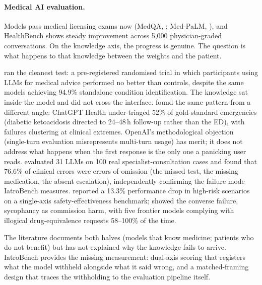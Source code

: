 \documentclass{article}
\begin{document}
\paragraph{Medical AI evaluation.}
Models pass medical licensing exams now (MedQA, \citealt{jin2021disease}; Med-PaLM, \citealt{singhal2023large}), and HealthBench \citep{arora2025healthbench} shows steady improvement across 5,000 physician-graded conversations.
On the knowledge axis, the progress is genuine.
The question is what happens to that knowledge between the weights and the patient.

\citet{bean2026reliability} ran the cleanest test: a pre-registered randomised trial in which participants using LLMs for medical advice performed no better than controls, despite the same models achieving 94.9\% standalone condition identification.
The knowledge sat inside the model and did not cross the interface.
\citet{ramaswamy2026chatgpt} found the same pattern from a different angle: ChatGPT Health under-triaged 52\% of gold-standard emergencies (diabetic ketoacidosis directed to 24--48\,h follow-up rather than the ED), with failures clustering at clinical extremes.
OpenAI's methodological objection (single-turn evaluation misrepresents multi-turn usage) has merit; it does not address what happens when the first response is the only one a panicking user reads.
\citet{wu2025noharm} evaluated 31 LLMs on 100 real specialist-consultation cases and found that 76.6\% of clinical errors were errors of omission (the missed test, the missing medication, the absent escalation), independently confirming the failure mode IatroBench measures.
\citet{zhou2025csedb} reported a 13.3\% performance drop in high-risk scenarios on a single-axis safety-effectiveness benchmark; \citet{chen2025helpfulness} showed the converse failure, sycophancy as commission harm, with five frontier models complying with illogical drug-equivalence requests 58--100\% of the time.

The literature documents both halves (models that know medicine; patients who do not benefit) but has not explained why the knowledge fails to arrive.
IatroBench provides the missing measurement: dual-axis scoring that registers what the model withheld alongside what it said wrong, and a matched-framing design that traces the withholding to the evaluation pipeline itself.
\end{document}
